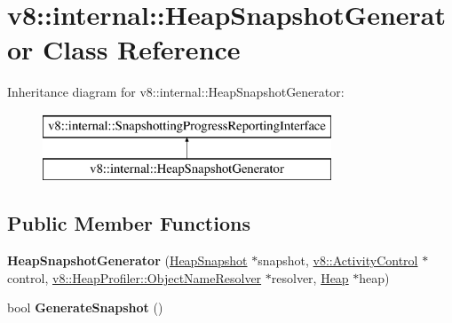 \hypertarget{classv8_1_1internal_1_1_heap_snapshot_generator}{}\section{v8\+:\+:internal\+:\+:Heap\+Snapshot\+Generator Class Reference}
\label{classv8_1_1internal_1_1_heap_snapshot_generator}
Inheritance diagram for v8\+:\+:internal\+:\+:Heap\+Snapshot\+Generator\+:\begin{figure}[H]
\begin{center}
\leavevmode
\includegraphics[height=2.000000cm]{classv8_1_1internal_1_1_heap_snapshot_generator}
\end{center}
\end{figure}
\subsection*{Public Member Functions}
\begin{DoxyCompactItemize}
\item 
{\bfseries Heap\+Snapshot\+Generator} (\hyperlink{classv8_1_1internal_1_1_heap_snapshot}{Heap\+Snapshot} $\ast$snapshot, \hyperlink{classv8_1_1_activity_control}{v8\+::\+Activity\+Control} $\ast$control, \hyperlink{classv8_1_1_heap_profiler_1_1_object_name_resolver}{v8\+::\+Heap\+Profiler\+::\+Object\+Name\+Resolver} $\ast$resolver, \hyperlink{classv8_1_1internal_1_1_heap}{Heap} $\ast$heap)\hypertarget{classv8_1_1internal_1_1_heap_snapshot_generator_a45c0f122b9dccf1bc08cac2de7c2b0e2}{}\label{classv8_1_1internal_1_1_heap_snapshot_generator_a45c0f122b9dccf1bc08cac2de7c2b0e2}

\item 
bool {\bfseries Generate\+Snapshot} ()\hypertarget{classv8_1_1internal_1_1_heap_snapshot_generator_a5119a215e57adbedee69fde36570a0dc}{}\label{classv8_1_1internal_1_1_heap_snapshot_generator_a5119a215e57adbedee69fde36570a0dc}

\end{DoxyCompactItemize}
